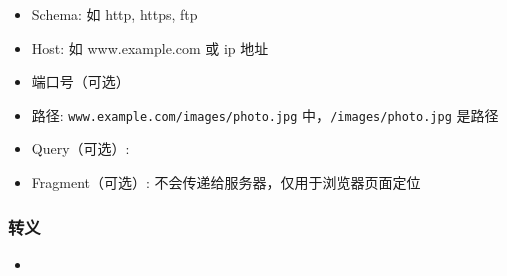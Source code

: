

\begin{issues}
\issueDraft
\end{issues}

\begin{itemize}
\item Schema: 如 http, https, ftp
\item Host: 如 www.example.com 或 ip 地址
\item 端口号（可选）
\item 路径: \verb`www.example.com/images/photo.jpg` 中，\verb`/images/photo.jpg` 是路径
\item Query（可选）:
\item Fragment（可选）: 不会传递给服务器，仅用于浏览器页面定位
\end{itemize}

\subsubsection{转义}
\begin{itemize}
\item 
\end{itemize}
